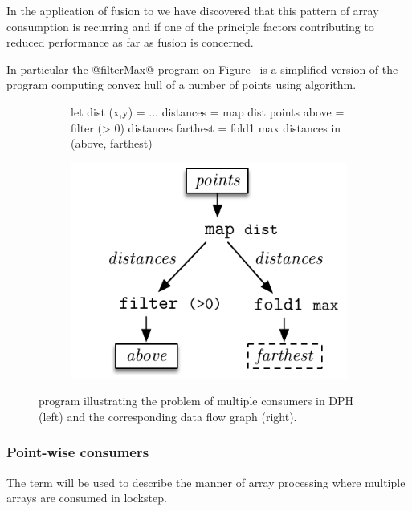 \documentclass[preamble.tex]{subfiles}
\begin{document}
In the application of fusion to \DPH we have discovered that this pattern of array consumption is recurring and if one of the principle factors contributing to reduced performance as far as fusion is concerned.

In particular the @filterMax@ program on Figure~ is a simplified version of the \DPH program computing convex hull of a number of points using  algorithm.

\begin{figure}

\begin{subfigure}{.5\textwidth}%
\begin{hscode}
let dist (x,y) = ...
    distances  = map dist points
    above      = filter (> 0) distances
    farthest   = fold1 max distances
in  (above, farthest)
\end{hscode}
\end{subfigure}%
%
\begin{subfigure}{.5\textwidth}%
\includegraphics[center,scale=0.85]{img/filterMax-dataflow}%
\end{subfigure}%

\caption{ program illustrating the problem of multiple consumers in DPH (left) and the corresponding data flow graph (right).}
\label{fig:filterMap}
\end{figure}




\subsubsection{Point-wise consumers}

The term  will be used to describe the manner of array processing where multiple arrays are consumed in lockstep.
\end{document}
